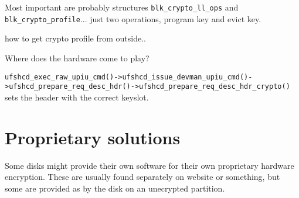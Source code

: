 Most important are probably structures \verb|blk_crypto_ll_ops| and \verb|blk_crypto_profile|... just two operations, program key and evict key. 



how to get crypto profile from outside..




Where does the hardware come to play?

\verb|ufshcd_exec_raw_upiu_cmd()->ufshcd_issue_devman_upiu_cmd()->ufshcd_prepare_req_desc_hdr()->ufshcd_prepare_req_desc_hdr_crypto()| sets the header with the correct keyslot.






\section{Proprietary solutions}

Some disks might provide their own software for their own proprietary hardware encryption. These are usually found separately on website or something, but some are provided as by the disk on an unecrypted partition.

